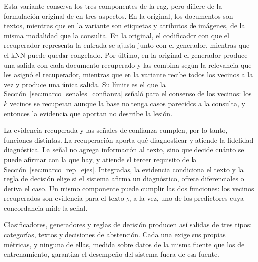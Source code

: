 Esta variante conserva los tres componentes de la \gls{rag}, pero difiere de la formulación original de
\textcite{lewis2020retrievalaugmented} en tres aspectos. En la original, los documentos son textos, mientras
que en la variante son etiquetas y atributos de imágenes, de la misma modalidad que la consulta. En la original,
el codificador con que el recuperador representa la entrada se ajusta junto con el generador, mientras que el
kNN puede quedar congelado. Por último, en la original el generador produce una salida con cada documento
recuperado y las combina según la relevancia que les asignó el recuperador, mientras que en la variante recibe
todos los vecinos a la vez y produce una única salida. Su límite es el que la
Sección~\ref{sec:marco_senales_confianza} señaló para el consenso de los vecinos: los $k$ vecinos se recuperan
aunque la base no tenga casos parecidos a la consulta, y entonces la evidencia que aportan no describe la
lesión.

\label{sec:marco_integracion}%
La evidencia recuperada y las señales de confianza cumplen, por lo tanto, funciones distintas. La recuperación
aporta qué diagnosticar y atiende la fidelidad diagnóstica. La señal no agrega información al texto, sino que
decide cuánto se puede afirmar con la que hay, y atiende el tercer requisito de la
Sección~\ref{sec:marco_rep_ejes}. Integradas, la evidencia condiciona el texto y la regla de decisión elige si
el sistema afirma un diagnóstico, ofrece diferenciales o deriva el caso. Un mismo componente puede cumplir las
dos funciones: los vecinos recuperados son evidencia para el texto y, a la vez, uno de los predictores cuya
concordancia mide la señal.

Clasificadores, generadores y reglas de decisión producen así salidas de tres tipos: categorías, textos y
decisiones de abstención. Cada una exige sus propias métricas, y ninguna de ellas, medida sobre datos de la
misma fuente que los de entrenamiento, garantiza el desempeño del sistema fuera de esa fuente.
